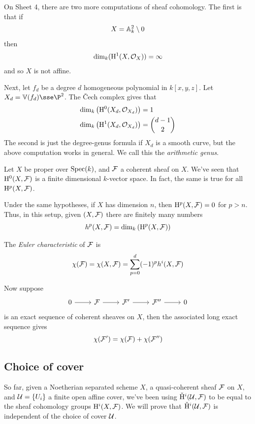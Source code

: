 \documentclass{article}
\begin{document}
On Sheet 4, there are two more computations of sheaf cohomology. The first is that if
\[X = \mathbb{A}_{k}^{2} \setminus 0\]
then
\[\dim_k(\mathrm{H}^1(X, \mathcal{O}_X)) = \infty\]
and so \(X\) is not affine.

Next, let \(f_d\) be a degree \(d\) homogeneous polynomial in \(k[x, y, z]\). Let \(X_d = \van(f_d) \sse \P^2\). The \v Cech complex gives that
\begin{align*}
    \dim_k\left(\mathrm{H}^0(X_d, \mathcal{O}_{X_d})\right) &= 1 \\
    \dim_k\left(\mathrm{H}^1(X_d, \mathcal{O}_{X_d})\right) &= {d-1 \choose 2}
\end{align*}
The second is just the degree-genus formula if \(X_d\) is a smooth curve, but the above computation works in general. We call this the \emph{arithmetic genus}.

Let \(X\) be proper over \(\operatorname{Spec}(k)\), and \(\mathcal{F}\) a coherent sheaf on \(X\). We've seen that \(\mathrm{H}^0(X, \mathcal{F})\) is a finite dimensional \(k\)-vector space. In fact, the same is true for all \(\mathrm{H}^p(X, \mathcal{F})\).

Under the same hypotheses, if \(X\) has dimension \(n\), then \(\mathrm{H}^p(X, \mathcal{F}) = 0\) for \(p > n\). Thus, in this setup, given \((X, \mathcal{F})\) there are finitely many numbers
\[h^p(X, \mathcal{F}) = \dim_k\left(\mathrm{H}^p(X, \mathcal{F})\right)\]
\begin{definition}
    The \emph{Euler characteristic} of \(\mathcal{F}\) is
    \[\chi(\mathcal{F}) = \chi(X, \mathcal{F}) = \sum_{p=0}^d (-1)^ph^i(X, \mathcal{F})\]
\end{definition}
Now suppose
\[\begin{tikzcd}
	0 & \mcF & {\mcF'} & {\mcF''} & 0
	\arrow[from=1-1, to=1-2]
	\arrow[from=1-2, to=1-3]
	\arrow[from=1-3, to=1-4]
	\arrow[from=1-4, to=1-5]
\end{tikzcd}\]
is an exact sequence of coherent sheaves on \(X\), then the associated long exact sequence gives
\[\chi(\mathcal{F}') = \chi(\mathcal{F}) + \chi(\mathcal{F}'')\]

\lec

\subsection{Choice of cover}

So far, given a Noetherian separated scheme \(X\), a quasi-coherent sheaf \(\mathcal{F}\) on \(X\), and \(\mathcal{U} = \{U_i\}\) a finite open affine cover, we've been using \(\check {\mathrm{H}}^i(\mathcal{U}, \mathcal{F})\) to be equal to the sheaf cohomology groups \(\mathrm{H}^i(X, \mathcal{F})\). We will prove that \(\check {\mathrm{H}}^i(\mathcal{U}, \mathcal{F})\) is independent of the choice of cover \(\mathcal{U}\).
\end{document}
